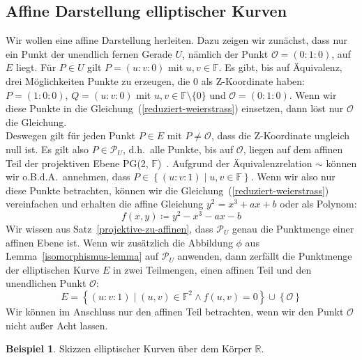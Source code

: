 \documentclass[hidelinks]{article}
\theoremstyle{plain}
\theoremstyle{definition}
\newtheorem{bsp}[thm]{Beispiel}
\theoremstyle{rem}
\newcommand{\pgtwo}{PG(2, $\mathbb{F}$)\ }
\newcommand{\fnz}{\mathbb{F}\setminus\{0\}}
\newcommand{\pu}{\mathcal{P}_U}
\newcommand{\patinf}{\mathcal{O}}
\begin{document}
\begin{sloppypar}
\subsection{Affine Darstellung elliptischer Kurven} \label{affine-darstellung}
Wir wollen eine affine Darstellung herleiten. Dazu zeigen wir zunächst, dass nur ein Punkt der unendlich fernen Gerade $U$, nämlich der Punkt $\patinf = (0:1:0)$, auf $E$ liegt.  Für $P \in U$ gilt $P = (u:v:0)$ mit $u,v \in \mathbb{F}$. Es gibt, bis auf Äquivalenz, drei Möglichkeiten Punkte zu erzeugen, die 0 als Z-Koordinate haben: $P = (1:0:0)$, $Q = (u:v:0)$ mit $u,v \in \fnz$ und $\patinf = (0:1:0)$. 
Wenn wir diese Punkte in die Gleichung~(\ref{reduziert-weierstrass}) einsetzen, dann löst nur $\patinf$ die Gleichung.\\ 
Deswegen gilt für jeden Punkt $P \in E$ mit $P \neq \patinf$, dass die Z-Koordinate ungleich null ist. Es gilt also $P \in \pu$, d.h.\ alle Punkte, bis auf $\patinf$, liegen auf dem affinen Teil der projektiven Ebene \pgtwo. 
Aufgrund der Äquivalenzrelation $\sim$ können wir o.B.d.A.\ annehmen, dass $P \in \left\{(u:v:1) \mid u,v \in \mathbb{F} \right\}$. Wenn wir also nur diese Punkte betrachten, können wir die Gleichung~(\ref{reduziert-weierstrass}) vereinfachen und erhalten die affine Gleichung $y^2 = x^3 + ax + b$ oder als Polynom: 
\begin{equation} \label{affines-polynom}
    f(x,y) \coloneqq y^2 - x^3 - ax - b
\end{equation}
Wir wissen aus Satz~\ref{projektive-zu-affinen}, dass $\pu$ genau die Punktmenge einer affinen Ebene ist. Wenn wir zusätzlich die Abbildung $\phi$ aus Lemma~\ref{isomorphismus-lemma} auf $\pu$ anwenden, dann zerfällt die Punktmenge der elliptischen Kurve $E$ in zwei Teilmengen, einen affinen Teil und den unendlichen Punkt $\patinf$:
\begin{equation} \label{elliptic-curve-aff-inf}
    E = \left\{(u:v:1) \mid (u,v) \in \mathbb{F}^2 \land f(u,v) = 0 \right\} \cup \left\{ \patinf \right\}
\end{equation}
Wir können im Anschluss nur den affinen Teil betrachten, wenn wir den Punkt $\patinf$ nicht außer Acht lassen.
\begin{bsp}
    Skizzen elliptischer Kurven über dem Körper $\mathbb{R}$.
    \begin{figure}[H]
        \centering
        \subfloat[$y^2=x^3 + 0.5x + 2$]{
            \begin{tikzpicture}
                \begin{axis}[
                    axis equal, 
                    scale=0.8
                    ]

\end{axis}
\end{tikzpicture}}
\end{figure}
\end{bsp}
\end{sloppypar}
\end{document}
